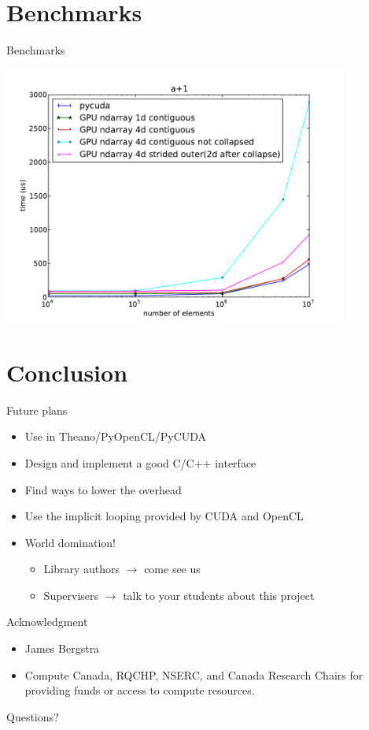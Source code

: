 \documentclass[utf8x,xcolor=pdftex,dvipsnames,table]{beamer}
\begin{document}
\section{Benchmarks}
\begin{frame}{Benchmarks}
\vspace{-1em}
\begin{center}
\includegraphics[width=0.85\textwidth]{ap1_no_alloc}
\end{center}
\end{frame}


\section{Conclusion}
\begin{frame}{Future plans}
\begin{itemize}
\item<1-> Use in Theano/PyOpenCL/PyCUDA
\item<2-> Design and implement a good C/C++ interface
\item<3-> Find ways to lower the overhead
\item<4-> Use the implicit looping provided by CUDA and OpenCL
\item<5-> World domination!
\begin{itemize}
\item<6-> Library authors $\to$ come see us
\item<6-> Supervisers $\to$ talk to your students about this project
\end{itemize}
\end{itemize}
\end{frame}

\begin{frame}{Acknowledgment}
\begin{itemize}
\item James Bergstra
\item Compute Canada, RQCHP, NSERC, and Canada Research Chairs for providing funds or access to compute resources.
\end{itemize}
\end{frame}

\begin{frame}
\begin{center}
\Huge
Questions?
\end{center}
\end{frame}
\end{document}
